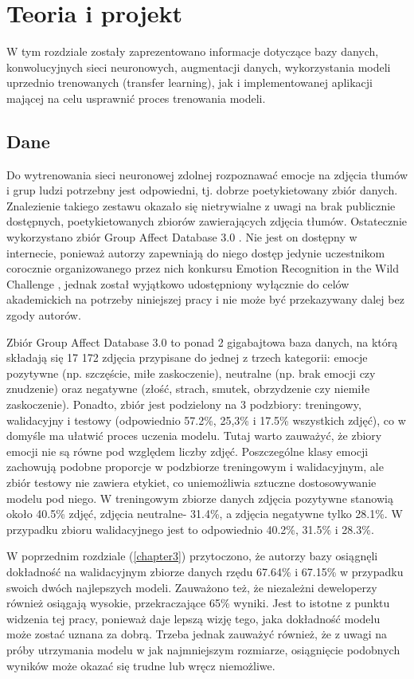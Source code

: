 \chapter{Teoria i projekt}
\thispagestyle{chapterBeginStyle}
\label{chapter4}


W tym rozdziale zostały zaprezentowano informacje dotyczące bazy danych, konwolucyjnych sieci neuronowych, augmentacji danych, wykorzystania modeli uprzednio trenowanych (transfer learning), jak i implementowanej aplikacji mającej na celu usprawnić proces trenowania modeli.


\section{Dane}
Do wytrenowania sieci neuronowej zdolnej rozpoznawać emocje na zdjęcia tłumów i grup ludzi potrzebny jest odpowiedni, tj. dobrze poetykietowany zbiór danych. Znalezienie takiego zestawu okazało się nietrywialne z uwagi na brak publicznie dostępnych, poetykietowanych zbiorów zawierających zdjęcia tłumów. Ostatecznie wykorzystano zbiór Group Affect Database 3.0 \cite{GAD}. Nie jest on dostępny w internecie, ponieważ autorzy zapewniają do niego dostęp jedynie uczestnikom corocznie organizowanego przez nich konkursu Emotion Recognition in the Wild Challenge \cite{EmotiwPage}\cite{EmotiwSummary}, jednak został wyjątkowo udostępniony wyłącznie do celów akademickich na potrzeby niniejszej pracy i nie może być przekazywany dalej bez zgody autorów. 

Zbiór Group Affect Database 3.0 to ponad 2 gigabajtowa baza danych, na którą składają się 17 172 zdjęcia przypisane do jednej z trzech kategorii: emocje pozytywne (np. szczęście, miłe zaskoczenie), neutralne (np. brak emocji czy znudzenie) oraz negatywne (złość, strach, smutek, obrzydzenie czy niemiłe zaskoczenie). Ponadto, zbiór jest podzielony na 3 podzbiory: treningowy, walidacyjny i testowy (odpowiednio 57.2\%, 25,3\% i 17.5\% wszystkich zdjęć), co w domyśle ma ułatwić proces uczenia modelu. Tutaj warto zauważyć, że zbiory emocji nie są równe pod względem liczby zdjęć. Poszczególne klasy emocji zachowują podobne proporcje w podzbiorze treningowym i walidacyjnym, ale zbiór testowy nie zawiera etykiet, co uniemożliwia sztuczne dostosowywanie modelu pod niego. W treningowym zbiorze danych zdjęcia pozytywne stanowią około 40.5\% zdjęć, zdjęcia neutralne- 31.4\%, a zdjęcia negatywne tylko 28.1\%. W przypadku zbioru walidacyjnego jest to odpowiednio 40.2\%, 31.5\% i 28.3\%.

W poprzednim rozdziale (\ref{chapter3}) przytoczono, że autorzy bazy osiągnęli dokładność na walidacyjnym zbiorze danych rzędu 67.64\% i 67.15\% w przypadku swoich dwóch najlepszych modeli. Zauważono też, że niezależni deweloperzy również osiągają wysokie, przekraczające 65\% wyniki. Jest to istotne z punktu widzenia tej pracy, ponieważ daje lepszą wizję tego, jaka dokładność modelu może zostać uznana za dobrą. Trzeba jednak zauważyć również, że z uwagi na próby utrzymania modelu w jak najmniejszym rozmiarze, osiągnięcie podobnych wyników może okazać się trudne lub wręcz niemożliwe.


